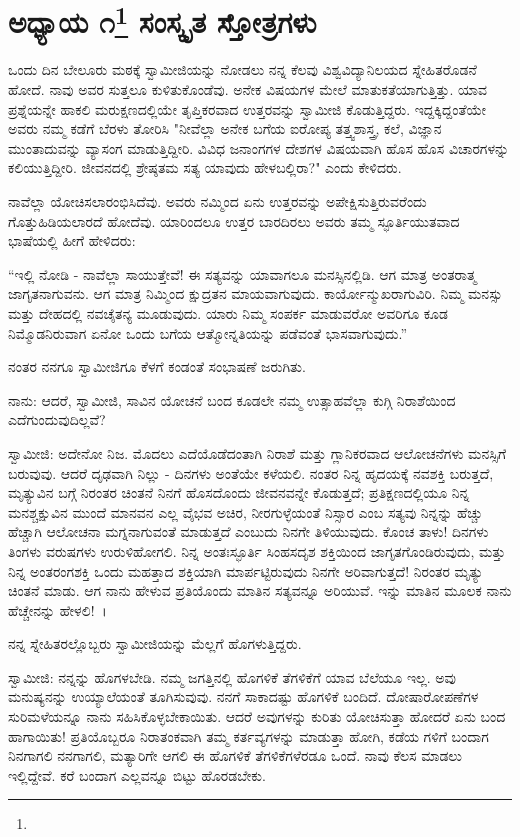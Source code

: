 
\chapter[ಅಧ್ಯಾಯ ೧]{ಅಧ್ಯಾಯ ೧\protect\footnote{} ಸಂಸ್ಕೃತ ಸ್ತೋತ್ರಗಳು}

ಒಂದು ದಿನ ಬೇಲೂರು ಮಠಕ್ಕೆ ಸ್ವಾಮೀಜಿಯನ್ನು ನೋಡಲು ನನ್ನ ಕೆಲವು ವಿಶ್ವವಿದ್ಯಾನಿಲಯದ ಸ್ನೇಹಿತರೊಡನೆ ಹೋದೆ. ನಾವು ಅವರ ಸುತ್ತಲೂ ಕುಳಿತುಕೊಂಡೆವು. ಅನೇಕ ವಿಷಯಗಳ ಮೇಲೆ ಮಾತುಕತೆಯಾಗುತ್ತಿತ್ತು. ಯಾವ ಪ್ರಶ್ನೆಯನ್ನೇ ಹಾಕಲಿ ಮರುಕ್ಷಣದಲ್ಲಿಯೇ ತೃಪ್ತಿಕರವಾದ ಉತ್ತರವನ್ನು ಸ್ವಾಮೀಜಿ ಕೊಡುತ್ತಿದ್ದರು. ಇದ್ದಕ್ಕಿದ್ದಂತೆಯೇ ಅವರು ನಮ್ಮ ಕಡೆಗೆ ಬೆರಳು ತೋರಿಸಿ "ನೀವೆಲ್ಲಾ ಅನೇಕ ಬಗೆಯ ಐರೋಪ್ಯ ತತ್ತ್ವಶಾಸ್ತ್ರ, ಕಲೆ, ವಿಜ್ಞಾನ ಮುಂತಾದುವನ್ನು ವ್ಯಾಸಂಗ ಮಾಡುತ್ತಿದ್ದೀರಿ. ವಿವಿಧ ಜನಾಂಗಗಳ ದೇಶಗಳ ವಿಷಯವಾಗಿ ಹೊಸ ಹೊಸ ವಿಚಾರಗಳನ್ನು ಕಲಿಯುತ್ತಿದ್ದೀರಿ. ಜೀವನದಲ್ಲಿ ಶ್ರೇಷ್ಠತಮ ಸತ್ಯ ಯಾವುದು ಹೇಳಬಲ್ಲಿರಾ?" ಎಂದು ಕೇಳಿದರು.

ನಾವೆಲ್ಲಾ ಯೋಚಿಸಲಾರಂಭಿಸಿದೆವು. ಅವರು ನಮ್ಮಿಂದ ಏನು ಉತ್ತರವನ್ನು ಅಪೇಕ್ಷಿಸುತ್ತಿರುವರೆಂದು ಗೊತ್ತುಹಿಡಿಯಲಾರದೆ ಹೋದೆವು. ಯಾರಿಂದಲೂ ಉತ್ತರ ಬಾರದಿರಲು ಅವರು ತಮ್ಮ ಸ್ಫೂರ್ತಿಯುತವಾದ ಭಾಷೆಯಲ್ಲಿ ಹೀಗೆ ಹೇಳಿದರು:

“ಇಲ್ಲಿ ನೋಡಿ - ನಾವೆಲ್ಲಾ ಸಾಯುತ್ತೇವೆ! ಈ ಸತ್ಯವನ್ನು ಯಾವಾಗಲೂ ಮನಸ್ಸಿನಲ್ಲಿಡಿ. ಆಗ ಮಾತ್ರ ಅಂತರಾತ್ಮ ಜಾಗೃತನಾಗುವನು. ಆಗ ಮಾತ್ರ ನಿಮ್ಮಿಂದ ಕ್ಷುದ್ರತನ ಮಾಯವಾಗುವುದು. ಕಾರ್ಯೋನ್ಮುಖರಾಗುವಿರಿ. ನಿಮ್ಮ ಮನಸ್ಸು ಮತ್ತು ದೇಹದಲ್ಲಿ ನವಚೈತನ್ಯ ಮೂಡುವುದು. ಯಾರು ನಿಮ್ಮ ಸಂಪರ್ಕ ಮಾಡುವರೋ ಅವರಿಗೂ ಕೂಡ ನಿಮ್ಮೊಡನಿರುವಾಗ ಏನೋ ಒಂದು ಬಗೆಯ ಆತ್ಮೋನ್ನತಿಯನ್ನು ಪಡೆವಂತೆ ಭಾಸವಾಗುವುದು.”

ನಂತರ ನನಗೂ ಸ್ವಾಮೀಜಿಗೂ ಕೆಳಗೆ ಕಂಡಂತೆ ಸಂಭಾಷಣೆ ಜರುಗಿತು.

ನಾನು: ಆದರೆ, ಸ್ವಾಮೀಜಿ, ಸಾವಿನ ಯೋಚನೆ ಬಂದ ಕೂಡಲೇ ನಮ್ಮ ಉತ್ಸಾಹವೆಲ್ಲಾ ಕುಗ್ಗಿ ನಿರಾಶೆಯಿಂದ ಎದೆಗುಂದುವುದಿಲ್ಲವೆ?

ಸ್ವಾಮೀಜಿ: ಅದೇನೋ ನಿಜ. ಮೊದಲು ಎದೆಯೊಡೆದಂತಾಗಿ ನಿರಾಶೆ ಮತ್ತು ಗ್ಲಾನಿಕರವಾದ ಆಲೋಚನೆಗಳು ಮನಸ್ಸಿಗೆ ಬರುವುವು. ಆದರೆ ದೃಢವಾಗಿ ನಿಲ್ಲು - ದಿನಗಳು ಅಂತೆಯೇ ಕಳೆಯಲಿ. ನಂತರ ನಿನ್ನ ಹೃದಯಕ್ಕೆ ನವಶಕ್ತಿ ಬರುತ್ತದೆ, ಮೃತ್ಯುವಿನ ಬಗ್ಗೆ ನಿರಂತರ ಚಿಂತನೆ ನಿನಗೆ ಹೊಸದೊಂದು ಜೀವನವನ್ನೇ ಕೊಡುತ್ತದೆ; ಪ್ರತಿಕ್ಷಣದಲ್ಲಿಯೂ ನಿನ್ನ ಮನಶ್ಚಕ್ಷುವಿನ ಮುಂದೆ ಮಾನವನ ಎಲ್ಲ ವೈಭವ ಅಚಿರ, ನೀರಗುಳ್ಳೆಯಂತೆ ನಿಸ್ಸಾರ ಎಂಬ ಸತ್ಯವು ನಿನ್ನನ್ನು ಹೆಚ್ಚು ಹೆಚ್ಚಾಗಿ ಆಲೋಚನಾ ಮಗ್ನನಾಗುವಂತೆ ಮಾಡುತ್ತದೆ ಎಂಬುದು ನಿನಗೇ ತಿಳಿಯುವುದು. ಕೊಂಚ ತಾಳು! ದಿನಗಳು ತಿಂಗಳು ವರುಷಗಳು ಉರುಳಿಹೋಗಲಿ. ನಿನ್ನ ಅಂತಃಸ್ಫೂರ್ತಿ ಸಿಂಹಸದೃಶ ಶಕ್ತಿಯಿಂದ ಜಾಗೃತಗೊಂಡಿರುವುದು, ಮತ್ತು ನಿನ್ನ ಅಂತರಂಗಶಕ್ತಿ ಒಂದು ಮಹತ್ತಾದ ಶಕ್ತಿಯಾಗಿ ಮಾರ್ಪಟ್ಟಿರುವುದು ನಿನಗೇ ಅರಿವಾಗುತ್ತದೆ! ನಿರಂತರ ಮೃತ್ಯು ಚಿಂತನೆ ಮಾಡು. ಆಗ ನಾನು ಹೇಳುವ ಪ್ರತಿಯೊಂದು ಮಾತಿನ ಸತ್ಯವನ್ನೂ ಅರಿಯುವೆ. ಇನ್ನು ಮಾತಿನ ಮೂಲಕ ನಾನು ಹೆಚ್ಚೇನನ್ನು ಹೇಳಲಿ!~।

ನನ್ನ ಸ್ನೇಹಿತರಲ್ಲೊಬ್ಬರು ಸ್ವಾಮೀಜಿಯನ್ನು ಮೆಲ್ಲಗೆ ಹೊಗಳುತ್ತಿದ್ದರು.

ಸ್ವಾಮೀಜಿ: ನನ್ನನ್ನು ಹೊಗಳಬೇಡಿ. ನಮ್ಮ ಜಗತ್ತಿನಲ್ಲಿ ಹೊಗಳಿಕೆ ತೆಗಳಿಕೆಗೆ ಯಾವ ಬೆಲೆಯೂ ಇಲ್ಲ. ಅವು ಮನುಷ್ಯನನ್ನು ಉಯ್ಯಾಲೆಯಂತೆ ತೂಗಿಸುವುವು. ನನಗೆ ಸಾಕಾದಷ್ಟು ಹೊಗಳಿಕೆ ಬಂದಿದೆ. ದೋಷಾರೋಪಣೆಗಳ ಸುರಿಮಳೆಯನ್ನೂ ನಾನು ಸಹಿಸಿಕೊಳ್ಳಬೇಕಾಯಿತು. ಆದರೆ ಅವುಗಳನ್ನು ಕುರಿತು ಯೋಚಿಸುತ್ತಾ ಹೋದರೆ ಏನು ಬಂದ ಹಾಗಾಯಿತು! ಪ್ರತಿಯೊಬ್ಬರೂ ನಿರಾತಂಕವಾಗಿ ತಮ್ಮ ಕರ್ತವ್ಯಗಳನ್ನು ಮಾಡುತ್ತಾ ಹೋಗಿ, ಕಡೆಯ ಗಳಿಗೆ ಬಂದಾಗ ನಿನಗಾಗಲಿ ನನಗಾಗಲಿ, ಮತ್ಯಾರಿಗೇ ಆಗಲಿ ಈ ಹೊಗಳಿಕೆ ತೆಗಳಿಕೆಗಳೆರಡೂ ಒಂದೆ. ನಾವು ಕೆಲಸ ಮಾಡಲು ಇಲ್ಲಿದ್ದೇವೆ. ಕರೆ ಬಂದಾಗ ಎಲ್ಲವನ್ನೂ ಬಿಟ್ಟು ಹೊರಡಬೇಕು.

